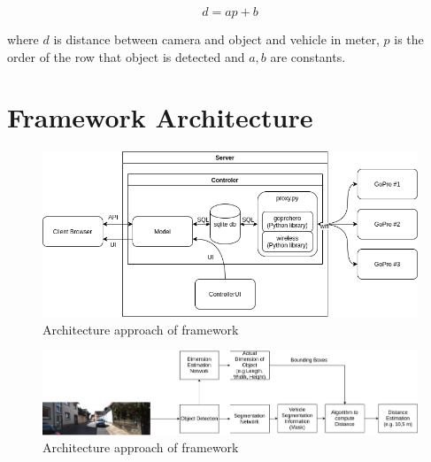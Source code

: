 \begin{equation}
    \label{eq:eq4}
    d = ap+b
\end{equation}

where $d$ is distance between camera and object and vehicle in meter, $p$ is the order of the row that object is detected and $a, b$ are constants.

 
\section{Framework Architecture} 

\begin{figure}[H]
\centering
\includegraphics[scale=0.6]{imagens/diagram.png}
\caption{Architecture approach of framework}
\label{fig:framework}
\end{figure}

\begin{figure}[H]
\centering
\includegraphics[width=\textwidth]{imagens/Network Behavior.png}
\caption{Architecture approach of framework}
\label{fig:networkBehavior}
\end{figure}